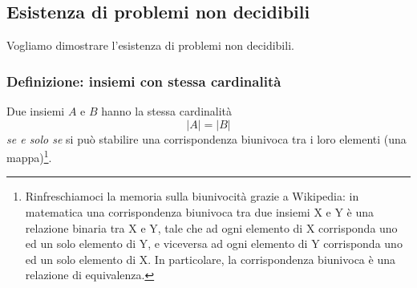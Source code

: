 


\subsection{Esistenza di problemi non decidibili}
Vogliamo dimostrare l'esistenza di problemi non decidibili.
\subsubsection{Definizione: insiemi con stessa cardinalità}
Due insiemi $A$ e $B$ hanno la stessa cardinalità 
\[|A|=|B|\]
\emph{se e solo se} si può stabilire una corrispondenza biunivoca tra i loro elementi (una mappa)\footnote{Rinfreschiamoci la memoria sulla biunivocità grazie a Wikipedia: in matematica una corrispondenza biunivoca tra due insiemi X e Y è una relazione binaria tra X e Y, tale che ad ogni elemento di X corrisponda uno ed un solo elemento di Y, e viceversa ad ogni elemento di Y corrisponda uno ed un solo elemento di X. In particolare, la corrispondenza biunivoca è una relazione di equivalenza.}.
